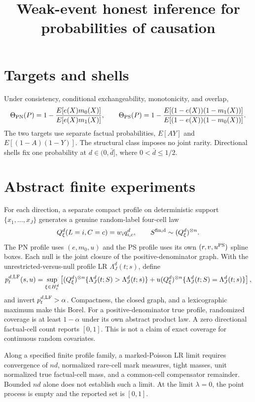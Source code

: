 \documentclass{article}
\begin{document}
\title{Weak-event honest inference for probabilities of causation}
\author{}
\date{}
\maketitle

\section{Targets and shells}
Under consistency, conditional exchangeability, monotonicity, and overlap,
\[
 \Theta_{\rm PN}(P)=1-
 \frac{E[e(X)m_0(X)]}{E[e(X)m_1(X)]},
 \qquad
 \Theta_{\rm PS}(P)=1-
 \frac{E[(1-e(X))(1-m_1(X))]}
 {E[(1-e(X))(1-m_0(X))]}.
\]
The two targets use separate factual probabilities, $E[AY]$ and
$E[(1-A)(1-Y)]$.  The structural class imposes no joint rarity.  Directional
shells fix one probability at $d\in(0,\bar d]$, where
$0<\bar d\leq 1/2$.

\section{Abstract finite experiments}
For each direction, a separate compact profile on deterministic support
$\{x_1,\ldots,x_J\}$ generates a genuine random-label four-cell law
\[
 Q^d_\xi(L=i,C=c)=w_iq^d_{i,c},
 \qquad S^{\rm fin,d}\sim(Q^d_\xi)^{\otimes n}.
\]
The PN profile uses $(e,m_0,u)$ and the PS profile uses its own
$(r,v,u^{\rm PS})$ spline boxes.  Each null is the joint closure of the
positive-denominator graph.  With the unrestricted-versus-null profile LR
$\Lambda_J^d(t;s)$, define
\[
 p_t^{d,\rm LF}(s,u)=\sup_{\xi\in H_t^d}
 \left[(Q_\xi^d)^{\otimes n}\{\Lambda_J^d(t;S)>
 \Lambda_J^d(t;s)\}+u(Q_\xi^d)^{\otimes n}\{\Lambda_J^d(t;S)=
 \Lambda_J^d(t;s)\}\right],
\]
and invert $p_t^{d,\rm LF}>\alpha$.  Compactness, the closed graph, and a
lexicographic maximum make this Borel.  For a positive-denominator true
profile, randomized coverage is at least $1-\alpha$ under its own abstract
product law.  A zero directional factual-cell count reports $[0,1]$.
This is not a claim of exact coverage for continuous random covariates.

Along a specified finite profile family, a marked-Poisson LR limit requires
convergence of $nd$, normalized rare-cell mark measures, tight masses, unit
normalized true factual-cell mass, and a common-cell compensator remainder.
Bounded $nd$ alone does not establish such a limit.  At the limit $\lambda=0$,
the point process is empty and the reported set is $[0,1]$.
\end{document}
